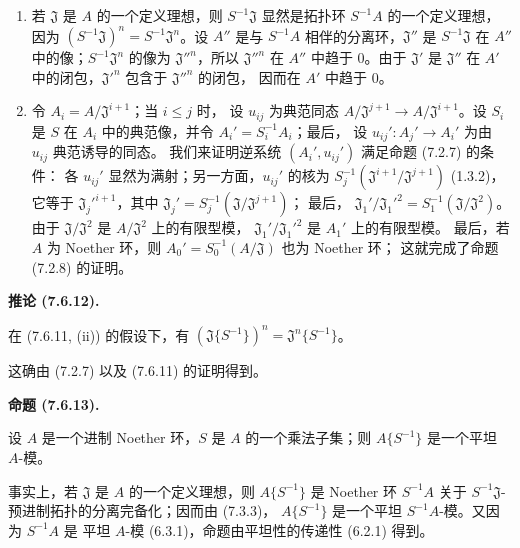 \documentclass[UTF8,fontset=none,11pt,oneside,openany]{ctexbook}
\newenvironment{proposition}[1][]{%
  \par\medskip\noindent\textbf{命题 (#1).}\ %
}{\par}
\newenvironment{corollary}[1][]{%
  \par\medskip\noindent\textbf{推论 (#1).}\ %
}{\par}
\let\EGAOriginalLabel\label
\renewcommand{\label}[1]{\phantomsection\EGAOriginalLabel{#1}}
\begin{document}
\begin{enumerate}
  \item[\rm(i)] 若 $\mathfrak J$ 是 $A$ 的一个定义理想，则
    $S^{-1}\mathfrak J$ 显然是拓扑环 $S^{-1}A$ 的一个定义理想，
    因为
    $(S^{-1}\mathfrak J)^n=S^{-1}\mathfrak J^n$。设 $A''$ 是与
    $S^{-1}A$ 相伴的分离环，$\mathfrak J''$ 是
    $S^{-1}\mathfrak J$ 在 $A''$ 中的像；$S^{-1}\mathfrak J^n$
    的像为 $\mathfrak J''^n$，所以 $\mathfrak J''^n$ 在 $A''$
    中趋于 0。由于 $\mathfrak J'$ 是 $\mathfrak J''$ 在 $A'$
    中的闭包，$\mathfrak J'^n$ 包含于 $\mathfrak J''^n$ 的闭包，
    因而在 $A'$ 中趋于 0。
  \item[\rm(ii)] 令 $A_i=A/\mathfrak J^{i+1}$；当 $i\leq j$ 时，
    设 $u_{ij}$ 为典范同态
    $A/\mathfrak J^{j+1}\to A/\mathfrak J^{i+1}$。设 $S_i$ 是
    $S$ 在 $A_i$ 中的典范像，并令 $A_i'=S_i^{-1}A_i$；最后，
    设 $u_{ij}':A_j'\to A_i'$ 为由 $u_{ij}$ 典范诱导的同态。
    我们来证明逆系统 $(A_i',u_{ij}')$ 满足命题 (7.2.7) 的条件：
    各 $u_{ij}'$ 显然为满射；另一方面，$u_{ij}'$ 的核为
    $S_j^{-1}(\mathfrak J^{i+1}/\mathfrak J^{j+1})$ (1.3.2)，
    它等于 $\mathfrak J_j'^{i+1}$，其中
    $\mathfrak J_j'=S_j^{-1}(\mathfrak J/\mathfrak J^{j+1})$；
    最后，
    $\mathfrak J_1'/\mathfrak J_1'^2=S_1^{-1}(\mathfrak J/\mathfrak J^2)$。
    由于 $\mathfrak J/\mathfrak J^2$ 是
    $A/\mathfrak J^2$ 上的有限型模，
    $\mathfrak J_1'/\mathfrak J_1'^2$ 是 $A_1'$ 上的有限型模。
    最后，若 $A$ 为 Noether 环，则
    $A_0'=S_0^{-1}(A/\mathfrak J)$ 也为 Noether 环；
    这就完成了命题 (7.2.8) 的证明。
\end{enumerate}

\begin{corollary}[7.6.12]
\label{0.7.6.12-fr}
在 (7.6.11, (ii)) 的假设下，有
$(\mathfrak J\{S^{-1}\})^n=\mathfrak J^n\{S^{-1}\}$。
\end{corollary}

这确由 (7.2.7) 以及 (7.6.11) 的证明得到。

\begin{proposition}[7.6.13]
\label{0.7.6.13-fr}
设 $A$ 是一个进制 Noether 环，$S$ 是 $A$ 的一个乘法子集；则
$A\{S^{-1}\}$ 是一个平坦 $A$-模。
\end{proposition}

事实上，若 $\mathfrak J$ 是 $A$ 的一个定义理想，则
$A\{S^{-1}\}$ 是 Noether 环 $S^{-1}A$ 关于
$S^{-1}\mathfrak J$-预进制拓扑的分离完备化；因而由 (7.3.3)，
$A\{S^{-1}\}$ 是一个平坦 $S^{-1}A$-模。又因为 $S^{-1}A$ 是
平坦 $A$-模 (6.3.1)，命题由平坦性的传递性 (6.2.1) 得到。
\end{document}
